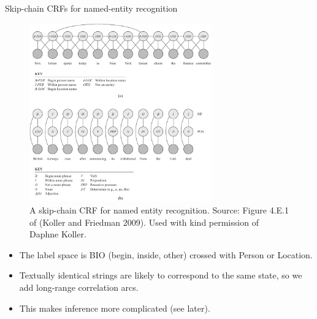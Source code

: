 \documentclass[10pt,mathserif]{beamer}
\begin{document}
\begin{frame}{Skip-chain CRFs for named-entity recognition}
\begin{figure}[h]
\centering
\includegraphics[width=0.7\textwidth]{crfSkip}
\caption{A skip-chain CRF for named entity recognition. Source: Figure 4.E.1 of (Koller and Friedman 2009). Used with kind permission of Daphne Koller.}
\end{figure}

\begin{itemize}
    \item The label space is BIO (begin, inside, other) crossed with Person or Location.
    \item Textually identical strings are likely to correspond to the same state, so we add long-range correlation arcs.
    \item This makes inference more complicated (see later).
\end{itemize}
\end{frame}
\end{document}
